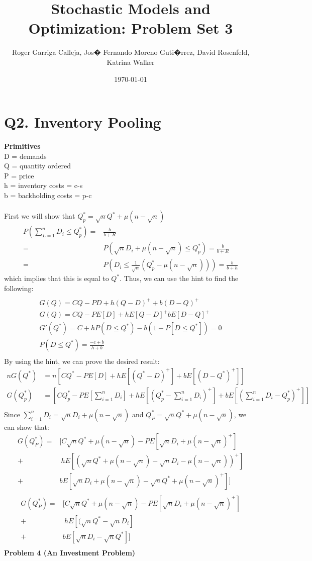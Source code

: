 \documentclass[11pt, english]{article}
\title{Stochastic Models and Optimization: Problem Set 3}
\author{Roger Garriga Calleja, Jos� Fernando Moreno Guti�rrez, David Rosenfeld, Katrina Walker}
\date{\today}
\begin{document}
	
\section{Q2. Inventory Pooling}
\textbf{Primitives}\\ D = demands \\ Q = quantity ordered \\ P = price \\ h =
inventory costs =  c-s \\ b = backholding costs = p-c \\ \\ First we will show
that $Q_p^* = \sqrt{n}Q^* + \mu(n- \sqrt{n})$%
\begin{align*} P (\sum_{L= 1}^n D_i \leq Q_p^*) = &  \frac{b}{b+R} \\ = &
P(\sqrt{n}D_i + \mu(n - \sqrt{n})\leq Q_p^*) = \frac{b}{b+R} \\ = & P(D_i \leq
\frac{1}{\sqrt{n}}(Q_p^*- \mu(n-\sqrt{n})))= \frac{b}{b + h} \end{align*} which
implies that this is equal to $Q^*$. Thus, we can use the hint to find the
following: 
\begin{align*} %
\end{align*}
\begin{align*} G(Q) = CQ - PD + h(Q-D)^++b(D-Q)^+ \\ G(Q) = CQ -
PE[D] + hE[Q-D]^+bE[D-Q]^+ \\ G'(Q^*)= C + hP(D \leq Q^*) - b(1-P[D\leq Q^*]) =
0 \\ P(D \leq Q^*) = \frac{-c+b}{h+b} \\ 
\end{align*} By using the hint, we can prove the desired result: 
\begin{align*} nG(Q^*) &=
n[CQ^*-PE[D]+hE[(Q^*-D)^+]+bE[(D-Q^*)^+]]\\ G(Q^*_p) & =
[CQ^*_p-PE[\sum_{i=1}^nD_i]+hE[(Q^*_p-\sum_{i=1}^nD_i)^+]+bE[(\sum_{i=1}^nD_i-Q^*_p)^+]]\\ 
\end{align*} 
Since $\sum_{i = 1}^nD_i = \sqrt{n}D_i+\mu(n-\sqrt{n})$ and $Q^*_P = \sqrt{n}Q^*+\mu(n-\sqrt{n})$, we can show that:\\
\begin{align*} 
G(Q^*_P) = & [C\sqrt{n}Q^*+\mu(n-\sqrt{n})-PE[\sqrt{n}D_i +  \mu(n-\sqrt{n})^+]\\
+& \ hE[(\sqrt{n}Q^*+\mu(n-\sqrt{n})-\sqrt{n}D_i-\mu(n-\sqrt{n}))^+] \\
+& b E[\sqrt{n}D_i+\mu(n-\sqrt{n})-\sqrt{n}Q^*+\mu(n-\sqrt{n})^+]]\\ 
\end{align*} 
\begin{align*} 
G(Q^*_P) = & [C\sqrt{n}Q^*+\mu(n-\sqrt{n})-PE[\sqrt{n}D_i +  \mu(n-\sqrt{n})^+]\\
+& \ hE[(\sqrt{n}Q^*-\sqrt{n}D_i] \\
+& b E[\sqrt{n}D_i-\sqrt{n}Q^*]]\\ 
\end{align*} 
\textbf{Problem 4 (An Investment Problem)}
\end{document}
